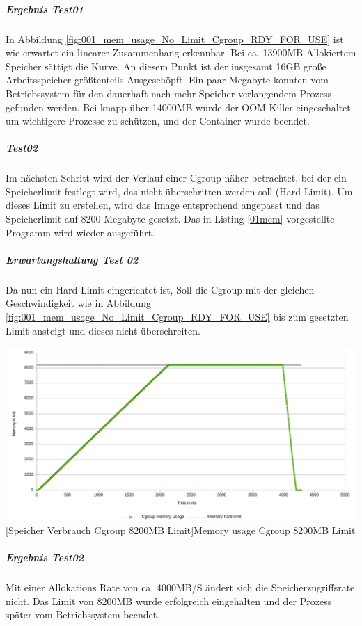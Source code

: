 \subparagraph{Ergebnis Test01}
In Abbildung \ref{fig:001_mem_usage_No_Limit_Cgroup_RDY_FOR_USE} ist wie erwartet ein linearer Zusammenhang erkennbar. Bei ca. 13900MB Allokiertem Speicher sättigt die Kurve. An diesem Punkt ist der insgesamt 16GB große Arbeitsspeicher größtenteils Ausgeschöpft. Ein paar Megabyte konnten vom Betriebssystem für den dauerhaft nach mehr Speicher verlangendem Prozess gefunden werden. Bei knapp über 14000MB wurde der OOM-Killer eingeschaltet um wichtigere Prozesse zu schützen, und der Container wurde beendet.

\subparagraph{Test02}
Im nächsten Schritt wird der Verlauf einer Cgroup näher betrachtet, bei der ein Speicherlimit festlegt wird, das nicht überschritten werden soll (Hard-Limit). Um dieses Limit zu erstellen, wird das Image entsprechend angepasst und das Speicherlimit auf 8200 Megabyte gesetzt. Das in Listing \ref{01mem} vorgestellte Programm wird wieder ausgeführt.

\subparagraph{Erwartungshaltung Test 02}
Da nun ein Hard-Limit eingerichtet ist, Soll die Cgroup mit der gleichen Geschwindigkeit wie in Abbildung \ref{fig:001_mem_usage_No_Limit_Cgroup_RDY_FOR_USE} bis zum gesetzten Limit ansteigt und dieses nicht überschreiten. 

\vspace{1em}
\begin{minipage}{\linewidth}
	\centering
	\includegraphics[width=1\linewidth]{pics/002_mem_usage_8200mb_limit_Cgroup_RDY_FOR_USE.png}
	[Speicher Verbrauch Cgroup 8200MB Limit]{Memory usage Cgroup 8200MB Limit}
	\label{fig:002_mem_usage_8200mb_limit_Cgroup_RDY_FOR_USE}
\end{minipage}

\subparagraph{Ergebnis Test02}
Mit einer Allokations Rate von ca. 4000MB/S ändert sich die Speicherzugriffsrate nicht. Das Limit von 8200MB wurde erfolgreich eingehalten und der Prozess später vom Betriebssystem beendet.

